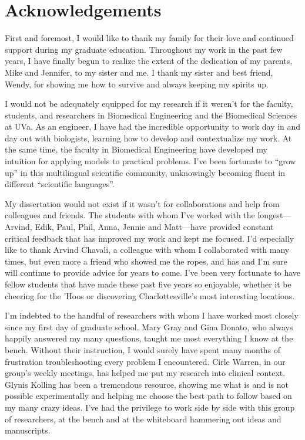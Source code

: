 \chapter{Acknowledgements}

First and foremost, I would like to thank my family for their
love and continued support during my graduate education. 
Throughout my work in the past few years, I have finally begun to realize
the extent of the dedication of my parents, Mike and Jennifer, to
my sister and me. I thank my sister and 
best friend, Wendy, for showing me how to survive and always 
keeping my spirits up.

I would not be adequately equipped for my research if it weren't for
the faculty, students, and researchers in Biomedical Engineering
and the Biomedical Sciences at UVa.
As an engineer, I have had the incredible opportunity to work day in and day out
with biologists, learning how to develop and contextualize my work.
At the same time, the faculty in Biomedical Engineering have developed my intuition for applying
models to practical problems.
I've been fortunate to ``grow up'' in 
this multilingual scientific community, unknowingly becoming fluent in different 
``scientific languages''.

My dissertation would not exist if it wasn't for collaborations
and help from colleagues and friends.
The students with whom I've worked with the longest---Arvind, 
Edik, Paul, Phil, Anna, Jennie and Matt---have provided constant critical feedback
that has improved my work and kept me focused. 
I'd especially like to thank
Arvind Chavali, a colleague with whom I collaborated with many times, but even more
a friend who showed me the ropes, and has and I'm sure will continue to provide advice
for years to come. I've been very fortunate to have fellow students that
have made these past five years so enjoyable, whether it be cheering for the 'Hoos
or discovering Charlottesville's most interesting locations.

I'm indebted to the handful of researchers with whom I have worked most closely
since my first day of graduate school. 
Mary Gray and Gina Donato, who always happily
answered my many questions, taught me most everything I know at the bench.
Without their instruction, I would surely have spent many months of frustration
troubleshooting every problem I encountered.
Cirle Warren, in our group's weekly meetings, has helped me
put my research into clinical context.
Glynis Kolling has been a tremendous resource, showing me what 
is and is not possible experimentally and helping me choose the best
path to follow based on my many crazy ideas.
I've had the privilege to work side by side with this group of researchers,
at the bench and at the whiteboard hammering out ideas and manuscripts.


